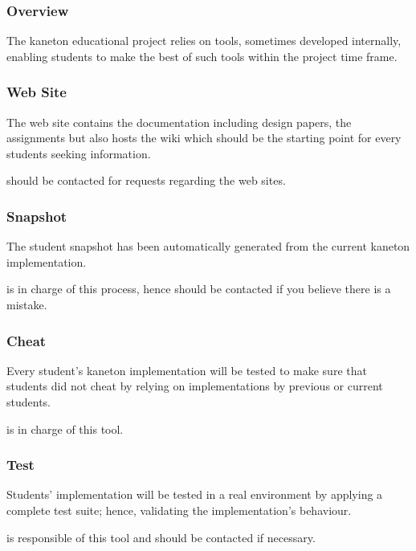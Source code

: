 
\begin{frame}
  \frametitle{Overview}

  The kaneton educational project relies on tools, sometimes developed
  internally, enabling students to make the best of such tools within the
  project time frame.
\end{frame}


\begin{frame}
  \frametitle{Web Site}

  The web site contains the documentation including design papers,
  the assignments \etc{} but also hosts the wiki which should be
  the starting point for every students seeking information.

  \-

   should be contacted for requests regarding the
  web sites.
\end{frame}


\begin{frame}
  \frametitle{Snapshot}

  The student snapshot has been automatically generated from the current
  kaneton implementation.

  \-

   is in charge of this process, hence should be
  contacted if you believe there is a mistake.
\end{frame}


\begin{frame}
  \frametitle{Cheat}

  Every student's kaneton implementation will be tested to make sure that
  students did not cheat by relying on implementations by previous or
  current students.

  \-

   is in charge of this tool.
\end{frame}


\begin{frame}
  \frametitle{Test}

  Students' implementation will be tested in a real environment by applying
  a complete test suite; hence, validating the implementation's behaviour.

  \-

   is responsible of this tool and should be contacted
  if necessary.
\end{frame}

